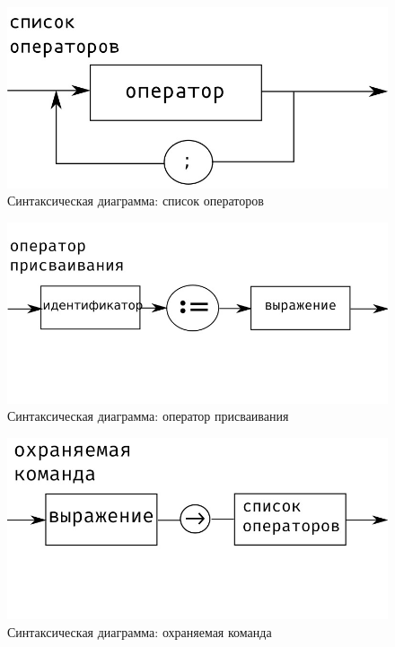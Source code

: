     \begin{figure}[H]
	\begin{center}
		\includegraphics[scale=0.7]{my_folder/images/virth/op_list}
		\caption{Синтаксическая диаграмма: список операторов}
	\end{center}
    \end{figure}
    
    \begin{figure}[H]
	\begin{center}
		\includegraphics[scale=0.7]{my_folder/images/virth/ass_op}
		\caption{Синтаксическая диаграмма: оператор присваивания}
	\end{center}
    \end{figure}
    
    \begin{figure}[H]
	\begin{center}
		\includegraphics[scale=0.7]{my_folder/images/virth/guarded_command}
		\caption{Синтаксическая диаграмма: охраняемая команда}
	\end{center}
    \end{figure}
    
